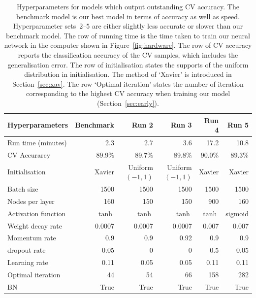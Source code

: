 \begin{table}
\caption{Hyperparameters for models which output outstanding CV accuracy. The benchmark model is our best model in terms of accuracy as well as speed. Hyperparameter sets~$2$--$5$ are either slightly less accurate or slower than our benchmark model. The row of running time is the time taken to train our neural network in the computer shown in Figure~\ref{fig:hardware}. The row of CV accuracy reports the classification accuracy of the CV samples, which includes the generalisation error. The row of initialisation states the supports of the uniform distribution in initialisation. The method of `Xavier' is introduced in Section~\ref{sec:xav}. The row `Optimal iteration' states the number of iteration corresponding to the highest CV accuracy when training our model (Section~\ref{sec:early}). \label{table:best-four-steps}}
\centering
{
\begin{tabular}{@{}lrrrrr@{}}
\toprule
Hyperparameters                & Benchmark  & Run 2           & Run 3           & Run 4  & Run 5  \\ \midrule
Run time (minutes)             & 2.3     & 2.7              & 3.6              & 17.2    & 10.8    \\
CV Accurarcy                 & 89.9\%  & 89.7\%           & 89.8\%           & 90.0\%  & 89.3\%  \\
Initialisation            & Xavier  & \parbox[t]{1.3cm}{\raggedleft Uniform\\$(-1,1)$} 
& \parbox[t]{1.3cm}{\raggedleft Uniform\\$(-1,1)$} 
                                                                            & Xavier  & Xavier  \\
Batch size                & 1500    & 1500             & 1500             & 1500    & 1500    \\
Nodes per layer         & 160     & 150              & 150              & 900     & 160     \\
Activation function       & $\tanh$ & $\tanh$          & $\tanh$          & $\tanh$ & sigmoid \\
Weight decay rate         & 0.0007  & 0.0007           & 0.0007           & 0.007   & 0.007   \\
Momentum rate             & 0.9     & 0.9              & 0.92             & 0.9     & 0.9     \\
dropout rate              & 0.05    &0              & 0              & 0.5     & 0.05    \\
Learning rate             & 0.11    & 0.05             & 0.05             & 0.11    & 0.11    \\
Optimal iteration & 44      & 54               & 66               & 158     & 282     \\ 
BN & True      & True          & True          & True       & True          \\\bottomrule
\end{tabular}
}
\end{table}
